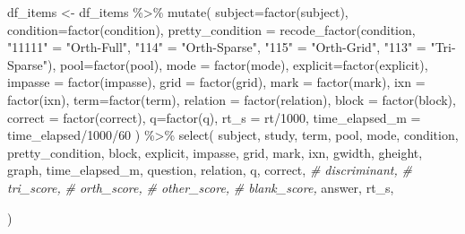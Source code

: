 \documentclass[
]{article}
\newenvironment{Shaded}{\begin{snugshade}}{\end{snugshade}}
\newcommand{\AttributeTok}[1]{\textcolor[rgb]{0.77,0.63,0.00}{#1}}
\newcommand{\CommentTok}[1]{\textcolor[rgb]{0.56,0.35,0.01}{\textit{#1}}}
\newcommand{\DecValTok}[1]{\textcolor[rgb]{0.00,0.00,0.81}{#1}}
\newcommand{\FunctionTok}[1]{\textcolor[rgb]{0.00,0.00,0.00}{#1}}
\newcommand{\NormalTok}[1]{#1}
\newcommand{\OtherTok}[1]{\textcolor[rgb]{0.56,0.35,0.01}{#1}}
\newcommand{\SpecialCharTok}[1]{\textcolor[rgb]{0.00,0.00,0.00}{#1}}
\newcommand{\StringTok}[1]{\textcolor[rgb]{0.31,0.60,0.02}{#1}}
\begin{document}
\begin{Shaded}
\begin{Highlighting}[]
\NormalTok{df\_items }\OtherTok{\textless{}{-}}\NormalTok{ df\_items }\SpecialCharTok{\%\textgreater{}\%} 
  \FunctionTok{mutate}\NormalTok{(}
    \AttributeTok{subject=}\FunctionTok{factor}\NormalTok{(subject),}
    \AttributeTok{condition=}\FunctionTok{factor}\NormalTok{(condition),}
    \AttributeTok{pretty\_condition =} \FunctionTok{recode\_factor}\NormalTok{(condition, }\StringTok{"11111"} \OtherTok{=} \StringTok{"Orth{-}Full"}\NormalTok{, }\StringTok{"114"} \OtherTok{=}  \StringTok{"Orth{-}Sparse"}\NormalTok{, }\StringTok{"115"} \OtherTok{=} \StringTok{"Orth{-}Grid"}\NormalTok{, }\StringTok{"113"} \OtherTok{=} \StringTok{"Tri{-}Sparse"}\NormalTok{),}
    \AttributeTok{pool=}\FunctionTok{factor}\NormalTok{(pool),}
    \AttributeTok{mode =} \FunctionTok{factor}\NormalTok{(mode),}
    \AttributeTok{explicit=}\FunctionTok{factor}\NormalTok{(explicit),}
    \AttributeTok{impasse =} \FunctionTok{factor}\NormalTok{(impasse),}
    \AttributeTok{grid =} \FunctionTok{factor}\NormalTok{(grid),}
    \AttributeTok{mark =} \FunctionTok{factor}\NormalTok{(mark),}
    \AttributeTok{ixn =} \FunctionTok{factor}\NormalTok{(ixn),}
    \AttributeTok{term=}\FunctionTok{factor}\NormalTok{(term),}
    \AttributeTok{relation =} \FunctionTok{factor}\NormalTok{(relation),}
    \AttributeTok{block =} \FunctionTok{factor}\NormalTok{(block),}
    \AttributeTok{correct =} \FunctionTok{factor}\NormalTok{(correct),}
    \AttributeTok{q=}\FunctionTok{factor}\NormalTok{(q),}
    \AttributeTok{rt\_s =}\NormalTok{ rt}\SpecialCharTok{/}\DecValTok{1000}\NormalTok{,}
    \AttributeTok{time\_elapsed\_m =}\NormalTok{ time\_elapsed}\SpecialCharTok{/}\DecValTok{1000}\SpecialCharTok{/}\DecValTok{60}
\NormalTok{  ) }\SpecialCharTok{\%\textgreater{}\%} \FunctionTok{select}\NormalTok{(}
\NormalTok{     subject,}
\NormalTok{     study,}
\NormalTok{     term,}
\NormalTok{     pool,}
\NormalTok{     mode,}
\NormalTok{     condition,}
\NormalTok{     pretty\_condition,}
\NormalTok{     block,}
\NormalTok{     explicit,}
\NormalTok{     impasse,}
\NormalTok{     grid,}
\NormalTok{     mark,}
\NormalTok{     ixn,}
\NormalTok{     gwidth,}
\NormalTok{     gheight,}
\NormalTok{     graph,}
\NormalTok{     time\_elapsed\_m,}
\NormalTok{     question,}
\NormalTok{     relation,}
\NormalTok{     q,}
\NormalTok{     correct,}
     \CommentTok{\# discriminant,}
     \CommentTok{\# tri\_score,}
     \CommentTok{\# orth\_score,}
     \CommentTok{\# other\_score,}
     \CommentTok{\# blank\_score,}
\NormalTok{     answer,}
\NormalTok{     rt\_s,}
     
\NormalTok{   ) }
\end{Highlighting}
\end{Shaded}
\end{document}
